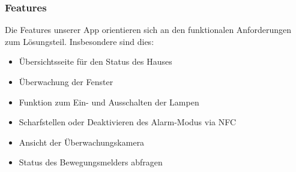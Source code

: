\subsubsection{Features}
Die Features unserer App orientieren sich an den funktionalen Anforderungen zum Lösungsteil. Insbesondere sind dies:

\begin{itemize}
	\item Übersichtsseite für den Status des Hauses
	\item Überwachung der Fenster
	\item Funktion zum Ein- und Ausschalten der Lampen
	\item Scharfstellen oder Deaktivieren des Alarm-Modus via NFC
	\item Ansicht der Überwachungskamera
	\item Status des Bewegungsmelders abfragen
\end{itemize}

